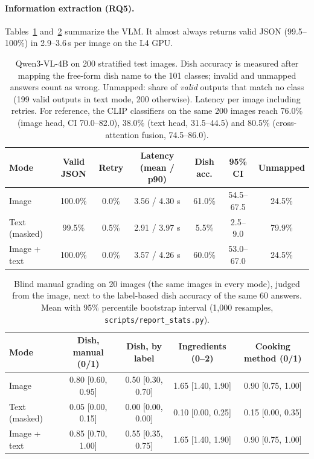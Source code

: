 \documentclass[11pt,a4paper]{article}
\begin{document}
\paragraph{Information extraction (RQ5).}
Tables~\ref{tab:vlm} and~\ref{tab:manual} summarize the VLM. It almost always returns valid JSON (99.5--100\%) in
2.9--3.6\,s per image on the L4 GPU.

\begin{table}[!htbp]
\centering
\caption{Qwen3-VL-4B on 200 stratified test images. Dish accuracy is measured after mapping the free-form dish name
to the 101 classes; invalid and unmapped answers count as wrong. Unmapped: share of \emph{valid} outputs that match
no class (199 valid outputs in text mode, 200 otherwise). Latency per image including retries. For reference, the
CLIP classifiers on the same 200 images reach 76.0\% (image head, CI 70.0--82.0), 38.0\% (text head, 31.5--44.5)
and 80.5\% (cross-attention fusion, 74.5--86.0).}
\label{tab:vlm}
\small
\begin{tabular}{lcccccc}
\toprule
Mode & Valid JSON & Retry & Latency (mean / p90) & Dish acc. & 95\% CI & Unmapped \\
\midrule
Image & 100.0\% & 0.0\% & 3.56 / 4.30 s & 61.0\% & 54.5--67.5 & 24.5\% \\
Text (masked) & 99.5\% & 0.5\% & 2.91 / 3.97 s & 5.5\% & 2.5--9.0 & 79.9\% \\
Image + text & 100.0\% & 0.0\% & 3.57 / 4.26 s & 60.0\% & 53.0--67.0 & 24.5\% \\
\bottomrule
\end{tabular}
\end{table}

\begin{table}[!htbp]
\centering
\caption{Blind manual grading on 20 images (the same images in every mode), judged from the image, next to the
label-based dish accuracy of the same 60 answers. Mean with 95\% percentile bootstrap interval (1,000 resamples,
\texttt{scripts/report\_stats.py}).}
\label{tab:manual}
\small
\setlength{\tabcolsep}{4pt}
\begin{tabular}{lcccc}
\toprule
Mode & Dish, manual (0/1) & Dish, by label & Ingredients (0--2) & Cooking method (0/1) \\
\midrule
Image & 0.80 [0.60, 0.95] & 0.50 [0.30, 0.70] & 1.65 [1.40, 1.90] & 0.90 [0.75, 1.00] \\
Text (masked) & 0.05 [0.00, 0.15] & 0.00 [0.00, 0.00] & 0.10 [0.00, 0.25] & 0.15 [0.00, 0.35] \\
Image + text & 0.85 [0.70, 1.00] & 0.55 [0.35, 0.75] & 1.65 [1.40, 1.90] & 0.90 [0.75, 1.00] \\
\bottomrule
\end{tabular}
\end{table}
\end{document}
